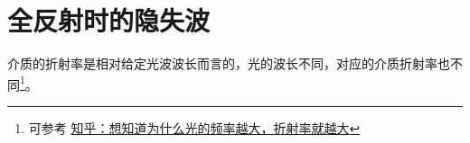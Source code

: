 \documentclass[UTF8]{report}
\theoremstyle{MyLineTheoremStyle} %
\theoremstyle{MyBlockTheoremStyle} %
\theoremstyle{MySubsubsectionStyle} %
\begin{document}


\section{全反射时的隐失波}

介质的折射率是相对给定光波波长而言的，光的波长不同，对应的介质折射率也不同\footnote{可参考 \href{https://www.zhihu.com/question/517129526/answer/3000822435}{知乎：想知道为什么光的频率越大，折射率就越大}}。
\end{document}
